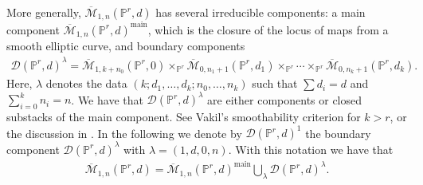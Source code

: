 \documentclass[pdftex]{sigma}
\numberwithin{equation}{section}
\newcommand{\MM}[4]{\overline{\mathcal M}_{#1,#2}(#3,#4)}
\theoremstyle{plain}
\theoremstyle{definition}
\theoremstyle{remark}
\begin{document}
\begin{Example}\label{ex:components} More generally, $\MM{1}{n}{\mathbb P^r}{d}$ has several irreducible components: a main component $\MM{1}{n}{\mathbb P^r}{d}^{\mathrm{main}}$, which is the closure of the locus of maps from a smooth elliptic curve, and boundary components \begin{gather*}\mathcal{D}(\mathbb{P}^r, d)^{\lambda}=\MM{1}{k+n_0}{\mathbb P^r}{0}\times_{\mathbb{P}^r}\MM{0}{n_1+1}{\mathbb P^r}{d_1}\times_{\mathbb{P}^r}\cdots \times_{\mathbb{P}^r} \MM{0}{n_k+1}{\mathbb P^r}{d_k}.\end{gather*} Here, $\lambda$ denotes the data $(k;d_1,\dots,d_k; n_0,\dots,n_k) $ such that $\sum d_i=d$ and $\sum\limits_{i=0}^k n_i=n$. We have that $\mathcal{D}(\mathbb{P}^r, d)^{\lambda}$ are either components or closed substacks of the main component. See Vakil's smoothability criterion \cite[Lemma~5.9]{Vre} for $k>r$, or the discussion in \cite[Section~2]{BCM}. In the following we denote by $\mathcal{D}(\mathbb{P}^r, d)^1$ the boundary component $\mathcal{D}(\mathbb{P}^r, d)^{\lambda}$ with $\lambda=(1,d,0,n)$. With this notation we have that \begin{gather*}\MM{1}{n}{\mathbb P^r}{d}=\MM{1}{n}{\mathbb P^r}{d}^{\mathrm{main}}\bigcup_{\lambda} \mathcal{D}(\mathbb{P}^r, d)^{\lambda}.\end{gather*}
\end{Example}
\end{document}
